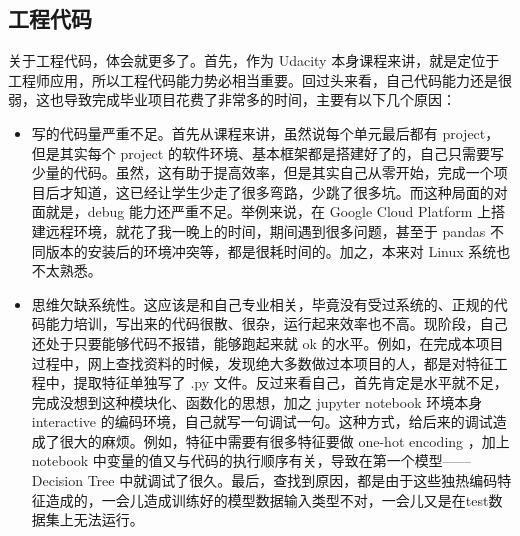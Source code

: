 \documentclass[a4paper]{article}
\begin{document}
\subsection{工程代码}
关于工程代码，体会就更多了。首先，作为 Udacity 本身课程来讲，就是定位于工程师应用，所以工程代码能力势必相当重要。回过头来看，自己代码能力还是很弱，这也导致完成毕业项目花费了非常多的时间，主要有以下几个原因：
\begin{itemize}
\item 写的代码量严重不足。首先从课程来讲，虽然说每个单元最后都有 project，但是其实每个 project 的软件环境、基本框架都是搭建好了的，自己只需要写少量的代码。虽然，这有助于提高效率，但是其实自己从零开始，完成一个项目后才知道，这已经让学生少走了很多弯路，少跳了很多坑。而这种局面的对面就是，debug 能力还严重不足。举例来说，在 Google Cloud Platform 上搭建远程环境，就花了我一晚上的时间，期间遇到很多问题，甚至于 pandas 不同版本的安装后的环境冲突等，都是很耗时间的。加之，本来对 Linux 系统也不太熟悉。
\item 思维欠缺系统性。这应该是和自己专业相关，毕竟没有受过系统的、正规的代码能力培训，写出来的代码很散、很杂，运行起来效率也不高。现阶段，自己还处于只要能够代码不报错，能够跑起来就 ok 的水平。例如，在完成本项目过程中，网上查找资料的时候，发现绝大多数做过本项目的人，都是对特征工程中，提取特征单独写了 .py 文件。反过来看自己，首先肯定是水平就不足，完成没想到这种模块化、函数化的思想，加之 jupyter notebook 环境本身 interactive 的编码环境，自己就写一句调试一句。这种方式，给后来的调试造成了很大的麻烦。例如，特征中需要有很多特征要做 one-hot encoding ，加上 notebook 中变量的值又与代码的执行顺序有关，导致在第一个模型——Decision Tree 中就调试了很久。最后，查找到原因，都是由于这些独热编码特征造成的，一会儿造成训练好的模型数据输入类型不对，一会儿又是在test数据集上无法运行。
\end{itemize}


\end{document}
